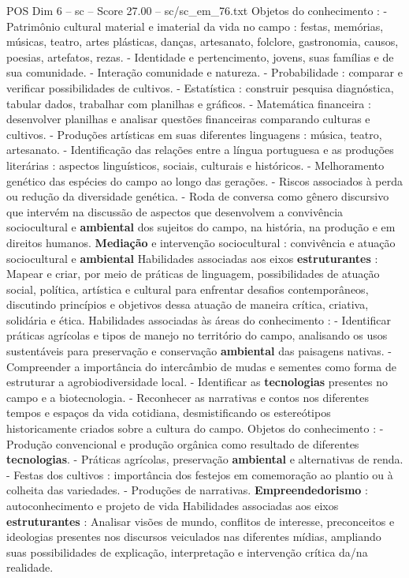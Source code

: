 \begin{textsample}{POS Dim 6 – sc – Score 27.00 – sc/sc\_em\_76.txt}
Objetos do conhecimento : - Patrimônio cultural material e imaterial da vida no campo : festas, memórias, músicas, teatro, artes plásticas, danças, artesanato, folclore, gastronomia, causos, poesias, artefatos, rezas. - Identidade e pertencimento, jovens, suas famílias e de sua comunidade. - Interação comunidade e natureza. - Probabilidade : comparar e verificar possibilidades de cultivos. - Estatística : construir pesquisa diagnóstica, tabular dados, trabalhar com planilhas e gráficos. - Matemática financeira : desenvolver planilhas e analisar questões financeiras comparando culturas e cultivos. - Produções artísticas em suas diferentes linguagens : música, teatro, artesanato. - Identificação das relações entre a língua portuguesa e as produções literárias : aspectos linguísticos, sociais, culturais e históricos. - Melhoramento genético das espécies do campo ao longo das gerações. - Riscos associados à perda ou redução da diversidade genética. - Roda de conversa como gênero discursivo que intervém na discussão de aspectos que desenvolvem a convivência sociocultural e \textbf{ambiental} dos sujeitos do campo, na história, na produção e em direitos humanos. \textbf{Mediação} e intervenção sociocultural : convivência e atuação sociocultural e \textbf{ambiental} Habilidades associadas aos eixos \textbf{estruturantes} : Mapear e criar, por meio de práticas de linguagem, possibilidades de atuação social, política, artística e cultural para enfrentar desafios contemporâneos, discutindo princípios e objetivos dessa atuação de maneira crítica, criativa, solidária e ética.
Habilidades associadas às áreas do conhecimento : - Identificar práticas agrícolas e tipos de manejo no território do campo, analisando os usos sustentáveis para preservação e conservação \textbf{ambiental} das paisagens nativas. - Compreender a importância do intercâmbio de mudas e sementes como forma de estruturar a agrobiodiversidade local. - Identificar as \textbf{tecnologias} presentes no campo e a biotecnologia. - Reconhecer as narrativas e contos nos diferentes tempos e espaços da vida cotidiana, desmistificando os estereótipos historicamente criados sobre a cultura do campo.
Objetos do conhecimento : - Produção convencional e produção orgânica como resultado de diferentes \textbf{tecnologias}. - Práticas agrícolas, preservação \textbf{ambiental} e alternativas de renda. - Festas dos cultivos : importância dos festejos em comemoração ao plantio ou à colheita das variedades. - Produções de narrativas. \textbf{Empreendedorismo} : autoconhecimento e projeto de vida Habilidades associadas aos eixos \textbf{estruturantes} : Analisar visões de mundo, conflitos de interesse, preconceitos e ideologias presentes nos discursos veiculados nas diferentes mídias, ampliando suas possibilidades de explicação, interpretação e intervenção crítica da/na realidade.

\end{textsample}
